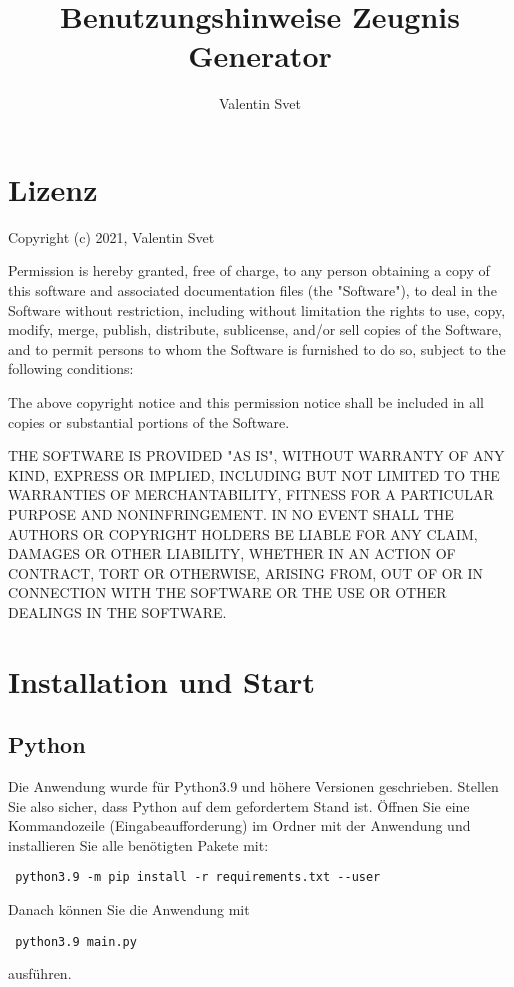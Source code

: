 \documentclass[a4paper,10pt]{scrartcl}
\title{Benutzungshinweise Zeugnis Generator}
\author{Valentin Svet}
\begin{document}
\maketitle

\newpage

\tableofcontents

\newpage

\section{Lizenz}
   Copyright (c) 2021, Valentin Svet
   \newline

   Permission is hereby granted, free of charge, to any person obtaining a copy
   of this software and associated documentation files (the "Software"), to deal
   in the Software without restriction, including without limitation the rights
   to use, copy, modify, merge, publish, distribute, sublicense, and/or sell
   copies of the Software, and to permit persons to whom the Software is
   furnished to do so, subject to the following conditions:
   \newline

   The above copyright notice and this permission notice shall be included in all
   copies or substantial portions of the Software.
   \newline

   THE SOFTWARE IS PROVIDED "AS IS", WITHOUT WARRANTY OF ANY KIND, EXPRESS OR
   IMPLIED, INCLUDING BUT NOT LIMITED TO THE WARRANTIES OF MERCHANTABILITY,
   FITNESS FOR A PARTICULAR PURPOSE AND NONINFRINGEMENT. IN NO EVENT SHALL THE
   AUTHORS OR COPYRIGHT HOLDERS BE LIABLE FOR ANY CLAIM, DAMAGES OR OTHER
   LIABILITY, WHETHER IN AN ACTION OF CONTRACT, TORT OR OTHERWISE, ARISING FROM,
   OUT OF OR IN CONNECTION WITH THE SOFTWARE OR THE USE OR OTHER DEALINGS IN THE
   SOFTWARE.
   \newpage

\section{Installation und Start}
   \subsection{Python}
      Die Anwendung wurde für Python3.9 und höhere Versionen geschrieben. Stellen Sie also sicher, dass Python auf dem gefordertem Stand ist.
      Öffnen Sie eine Kommandozeile (Eingabeaufforderung) im Ordner mit der Anwendung und installieren Sie alle benötigten Pakete mit:
      \begin{verbatim} python3.9 -m pip install -r requirements.txt --user \end{verbatim}
      Danach können Sie die Anwendung mit 
      \begin{verbatim} python3.9 main.py  \end{verbatim}
      ausführen. 
\end{document}
